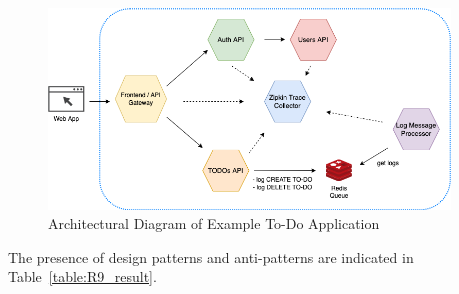 \documentclass{Configuration_Files/PoliMi3i_thesis}
\begin{document}
\begin{figure}[H]
\centering
\includegraphics[width=0.95\textwidth]{myImages/R9.png}
\caption{Architectural Diagram of Example To-Do Application}
\label{fig:R9_arch}
\end{figure}

The presence of design patterns and anti-patterns are indicated in Table~\ref{table:R9_result}.
\end{document}

